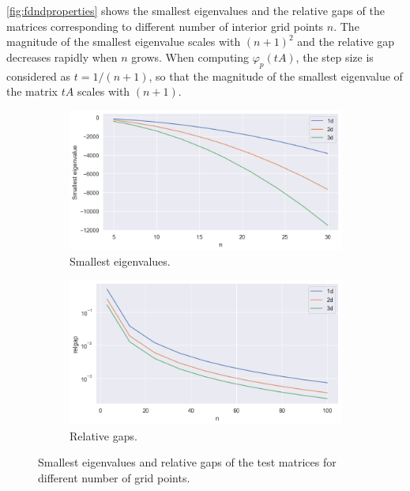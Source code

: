 \autoref{fig:fdndproperties} shows the smallest eigenvalues and the relative gaps of the matrices corresponding to different
number of interior grid points $n$. The magnitude of the smallest eigenvalue scales with $(n+1)^2$ and the relative gap
decreases rapidly when $n$ grows. When computing $\varphi_p(tA)$, the step size is considered as $t = 1 / (n + 1)$, so that
the magnitude of the smallest eigenvalue of the matrix $tA$ scales with $(n+1)$.

\begin{figure}[h!]
    \centering
    \begin{subfigure}[b]{0.45\textwidth}
        \includegraphics[width=\textwidth]{img/fd_nd_eigvals.png}
        \caption{Smallest eigenvalues.}
        \label{fig:fdndeigvals}
    \end{subfigure}
    \hfill
    \begin{subfigure}[b]{0.45\textwidth}
        \includegraphics[width=\textwidth]{img/fd_nd_relgaps.png}
        \caption{Relative gaps.}
        \label{fig:fdndrelgaps}
    \end{subfigure}
    \caption{Smallest eigenvalues and relative gaps of the test matrices for different number of grid points.}
    \label{fig:fdndproperties}
\end{figure}


